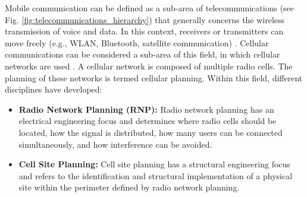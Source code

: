 \begin{English}
    Mobile communication can be defined as a sub-area of telecommunications (see Fig. \ref{fig:telecommunications_hierarchy}) that generally concerns the wireless transmission of voice and data. In this context, receivers or transmitters can move freely (e.g., WLAN, Bluetooth, satellite communication) \cite{bundesamtfurstrahlenschutzWhatMobileCommunication}. Cellular communications can be considered a sub-area of this field, in which cellular networks are used \cite{jiangCellularCommunicationNetworks2024}. A cellular network is composed of multiple radio cells. The planning of these networks is termed cellular planning. Within this field, different disciplines have developed:

    \begin{itemize}
        \item \textbf{Radio Network Planning (RNP):} Radio network planning has an electrical engineering focus and determines where radio cells should be located, how the signal is distributed, how many users can be connected simultaneously, and how interference can be avoided. \cite{academyforlorawanrAcademyLoRaWANWhat,telecomtrainerRNPRadioNetwork2023}

        \item \textbf{Cell Site Planning:} Cell site planning has a structural engineering focus and refers to the identification and structural implementation of a physical site within the perimeter defined by radio network planning. \cite{habibPDFStudyCell2024}
    \end{itemize}
\end{English}

